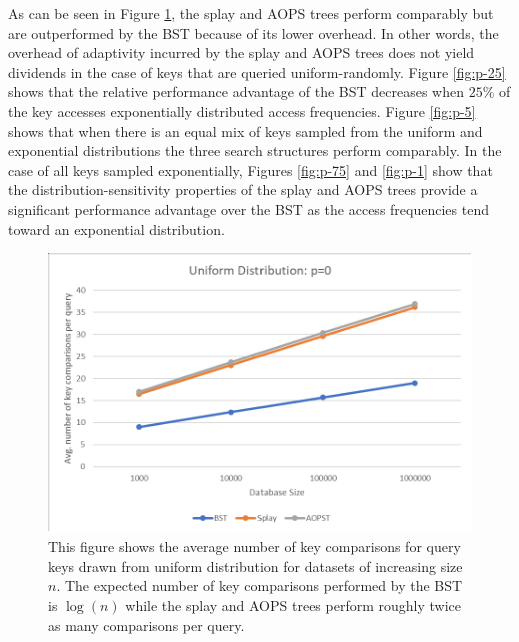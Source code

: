 \documentclass{article}
\newcommand{\figwid}{0.9\linewidth}
\begin{document}
As can be seen in Figure \ref{fig:p-0}, the splay and AOPS trees perform comparably but are outperformed by the BST because of its lower overhead. In other words, the overhead of adaptivity incurred by the splay and AOPS trees does not yield dividends in the case of keys that are queried uniform-randomly. Figure \ref{fig:p-25} shows that the relative performance advantage of the BST decreases when $25\%$ of the key accesses exponentially distributed access frequencies. Figure \ref{fig:p-5} shows that when there is an equal mix of keys sampled from the uniform and exponential distributions the three search structures perform comparably. In the case of all keys sampled exponentially, Figures \ref{fig:p-75} and \ref{fig:p-1} show that the distribution-sensitivity properties of the splay and AOPS trees provide a significant performance advantage over the BST as the access frequencies tend toward an exponential distribution.

\begin{figure}[H]
\begin{center}
\includegraphics[width=\figwid,keepaspectratio]{p-0.pdf}
\caption{\footnotesize This figure shows the average number of key comparisons for query keys drawn from uniform distribution for datasets of increasing size $n$. The expected number of key comparisons performed by the BST is $\log(n)$ while the splay and AOPS trees perform roughly twice as many comparisons per query.}
\label{fig:p-0}
\end{center}
\end{figure}
\end{document}
